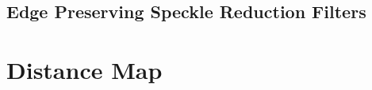 



\subsection{Edge Preserving Speckle Reduction Filters}
\label{sec:SpeckleFilters}
\ifitkFullVersion

\fi



\section{Distance Map}
\label{sec:DistanceMap}

\ifitkFullVersion

\fi









